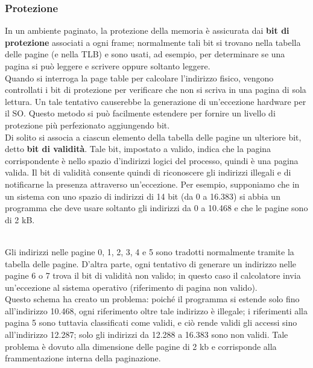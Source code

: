 \documentclass{article}
\begin{document}
			\subsubsection{Protezione}
				In un ambiente paginato, la protezione della memoria è assicurata dai \textbf{bit di protezione} associati a ogni frame; normalmente tali bit si trovano nella tabella delle pagine (e nella TLB) e sono usati, ad esempio, per determinare se una pagina si può leggere e scrivere oppure soltanto leggere. 
				\\Quando si interroga la page table per calcolare l’indirizzo fisico, vengono controllati i bit di protezione per verificare che non si scriva in una pagina di sola lettura. Un tale tentativo causerebbe la generazione di un’eccezione hardware per il SO. Questo metodo si può facilmente estendere per fornire un livello di protezione più perfezionato aggiungendo bit.
				\\Di solito si associa a ciascun elemento della tabella delle pagine un ulteriore bit, detto \textbf{bit di validità}. Tale bit, impostato a valido, indica che la pagina corrispondente è nello spazio d’indirizzi logici del processo, quindi è una pagina valida. Il bit di validità consente quindi di riconoscere gli indirizzi illegali e di notificarne la presenza attraverso un’eccezione.
				\newpage
				\noindent Per esempio, supponiamo che in un sistema con uno spazio di indirizzi di 14 bit (da 0 a 16.383) si abbia un programma che deve usare soltanto gli indirizzi da 0 a 10.468 e che le pagine sono di 2 kB.
				\begin{figure}[ht!]
				\end{figure}
				\\Gli indirizzi nelle pagine 0, 1, 2, 3, 4 e 5 sono tradotti normalmente tramite la tabella delle pagine. D’altra parte, ogni tentativo di generare un indirizzo nelle pagine 6 o 7 trova il bit di validità non valido; in questo caso il calcolatore invia un’eccezione al sistema operativo (riferimento di pagina non valido).
				\\Questo schema ha creato un problema: poiché il programma si estende solo fino all’indirizzo 10.468, ogni riferimento oltre tale indirizzo è illegale; i riferimenti alla pagina 5 sono tuttavia classificati come validi, e ciò rende validi gli accessi sino all’indirizzo 12.287; solo gli indirizzi da 12.288 a 16.383 sono non validi. Tale problema è dovuto alla dimensione delle pagine di 2 kb e corrisponde alla frammentazione interna della paginazione.
			
\end{document}
